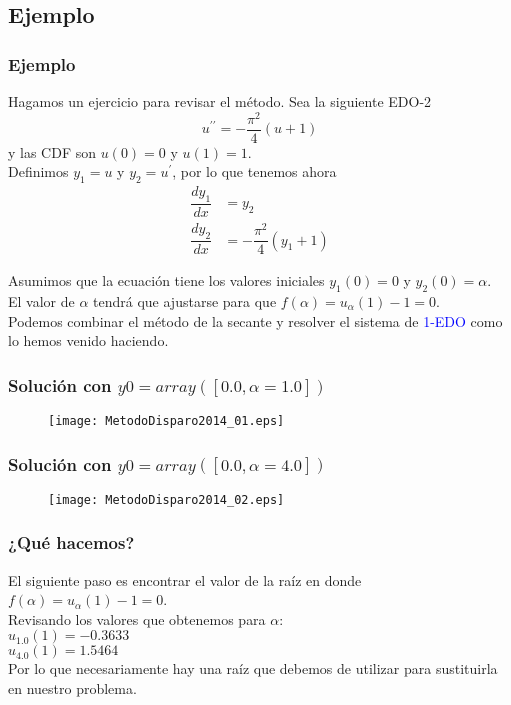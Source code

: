 \subsection{Ejemplo}
\begin{frame}
\frametitle{Ejemplo}
Hagamos un ejercicio para revisar el método. Sea la siguiente EDO-2
\begin{equation}
u^{\prime \prime} = - \dfrac{\pi^{2}}{4}(u + 1)
\end{equation}
y las CDF son $u(0) = 0$ y $u(1) = 1$. 
\\
\bigskip
\pause
Definimos $y_{1} = u$ y $y_{2} = u^{\prime}$, por lo que tenemos ahora
\begin{align*}
\dfrac{dy_{1}}{dx} &= y_{2} \\
\dfrac{dy_{2}}{dx} &= - \dfrac{\pi^{2}}{4}(y_{1} + 1)
\end{align*}
\end{frame}
\begin{frame}
Asumimos que la ecuación tiene los valores iniciales $y_{1}(0) = 0$ y $y_{2}(0) = \alpha$.
\\
\bigskip
\pause
El valor de $\alpha$ tendrá que ajustarse para que $f(\alpha) = u_{\alpha}(1) - 1 = 0$.
\\
\bigskip
Podemos combinar el método de la secante y resolver el sistema de \textcolor{blue}{1-EDO} como lo hemos venido haciendo.
\end{frame}
\begin{frame}[fragile]
\frametitle{Solución con $y0 = array([0.0,\alpha=1.0])$}
\begin{figure}
	\centering
	\texttt{[image: MetodoDisparo2014\_01.eps]}
\end{figure}
\end{frame}
\begin{frame}[fragile]
\frametitle{Solución con $y0 = array([0.0,\alpha=4.0])$}
\begin{figure}
	\centering
	\texttt{[image: MetodoDisparo2014\_02.eps]}
\end{figure}
\end{frame}
\begin{frame}
\frametitle{¿Qué hacemos?}
El siguiente paso es encontrar el valor de la raíz en donde $f(\alpha) = u_{\alpha}(1) - 1 = 0$.
\\
\medskip
Revisando los valores que obtenemos para $\alpha$:
\\
\medskip
$u_{1.0}(1) = -0.3633$ \\
$u_{4.0}(1) = 1.5464$
\\
\medskip
Por lo que necesariamente hay una raíz que debemos de utilizar para sustituirla en nuestro problema.
\end{frame}
